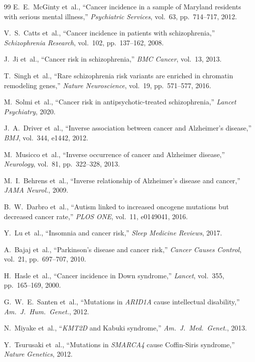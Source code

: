 \documentclass[11pt]{article}
\theoremstyle{definition}
\begin{document}
\begin{thebibliography}{99}
E.~E.~McGinty et~al., ``Cancer incidence in a sample of
{M}aryland residents with serious mental illness,''
\emph{Psychiatric Services}, vol.~63, pp.~714--717, 2012.

V.~S.~Catts et~al., ``Cancer incidence in patients with
schizophrenia,'' \emph{Schizophrenia Research}, vol.~102,
pp.~137--162, 2008.

J.~Ji et~al., ``Cancer risk in schizophrenia,'' \emph{BMC Cancer},
vol.~13, 2013.

T.~Singh et~al., ``Rare schizophrenia risk variants are enriched
in chromatin remodeling genes,'' \emph{Nature Neuroscience},
vol.~19, pp.~571--577, 2016.

M.~Solmi et~al., ``Cancer risk in antipsychotic-treated
schizophrenia,'' \emph{Lancet Psychiatry}, 2020.

J.~A.~Driver et~al., ``Inverse association between cancer and
{A}lzheimer's disease,'' \emph{BMJ}, vol.~344, e1442, 2012.

M.~Musicco et~al., ``Inverse occurrence of cancer and {A}lzheimer
disease,'' \emph{Neurology}, vol.~81, pp.~322--328, 2013.

M.~I.~Behrens et~al., ``Inverse relationship of {A}lzheimer's
disease and cancer,'' \emph{JAMA Neurol.}, 2009.

B.~W.~Darbro et~al., ``Autism linked to increased oncogene
mutations but decreased cancer rate,'' \emph{PLOS ONE}, vol.~11,
e0149041, 2016.

Y.~Lu et~al., ``Insomnia and cancer risk,'' \emph{Sleep Medicine
Reviews}, 2017.

A.~Bajaj et~al., ``{P}arkinson's disease and cancer risk,''
\emph{Cancer Causes Control}, vol.~21, pp.~697--707, 2010.

H.~Hasle et~al., ``Cancer incidence in {D}own syndrome,''
\emph{Lancet}, vol.~355, pp.~165--169, 2000.

G.~W.~E.~Santen et~al., ``Mutations in \emph{ARID1A} cause
intellectual disability,'' \emph{Am.~J.~Hum.~Genet.}, 2012.

N.~Miyake et~al., ``\emph{KMT2D} and {K}abuki syndrome,''
\emph{Am.~J.~Med.~Genet.}, 2013.

Y.~Tsurusaki et~al., ``Mutations in \emph{SMARCA4} cause
{C}offin-{S}iris syndrome,'' \emph{Nature Genetics}, 2012.


\end{thebibliography}
\end{document}
